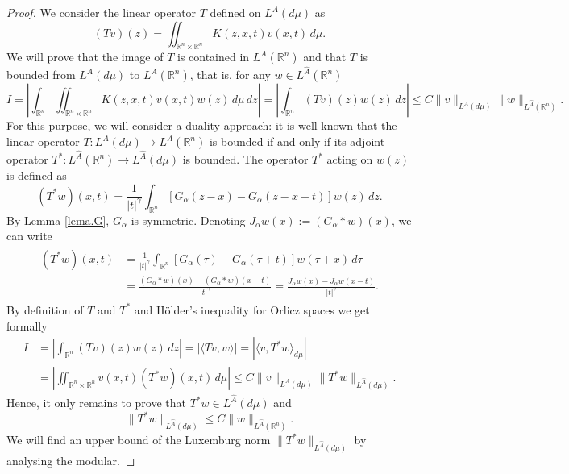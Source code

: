 \documentclass[leqno,twoside, 12pt]{amsart}
\theoremstyle{plain}
\numberwithin{equation}{section} \numberwithin{figure}{section}
\theoremstyle{definition}
\newcommand{\R}{\mathbb R}
\numberwithin{equation}{section}
\begin{document}
\begin{proof}
We consider the linear operator $T$ defined on $L^A(d\mu)$ as 
$$
(Tv)(z) = \iint_{\mathbb{R}^n \times \mathbb{R}^n} K(z,x,t) v(x,t) \,d\mu.
$$
We will prove that the image of $T$ is contained in $L^A(\R^n)$ and   that $T$ is bounded from $L^A(d\mu)$ to $L^A(\mathbb{R}^n)$, that is, for any $w \in L^{\hat{A}}(\mathbb{R}^n)$
$$
I=\left|\int_{\R^n} \iint_{\R^n \times \R^n} K(z,x,t) v(x,t) w(z)\,d\mu \,dz \right| = \left| \int_{\mathbb{R}^n} (Tv)(z) w(z) \, dz \right| \leq C \|v\|_{L^A(d\mu)} \|w\|_{L^{\hat{A}}(\mathbb{R}^n)}.
$$
For this purpose, we will consider a duality approach: it is well-known that the linear operator $T\colon L^A(d\mu)\to L^A(\R^n)$ is bounded if and only if its adjoint operator $T^*\colon L^{\hat A}(\R^n)\to L^{\hat A}(d\mu)$ is bounded. The operator $T^*$ acting on $w(z)$ is defined as
$$
(T^*w)(x,t) = \frac{1}{|t|^\gamma} \int_{\mathbb{R}^n} [G_\alpha(z-x) - G_\alpha(z-x+t)] w(z) \, dz.
$$
By Lemma \ref{lema.G}, $G_\alpha$ is symmetric. Denoting $J_\alpha w(x):= (G_\alpha*w)(x)$,  we  can write
\begin{align} \label{eqt.star}
\begin{split}
(T^*w)(x,t) &= \frac{1}{|t|^\gamma} \int_{\mathbb{R}^n} [G_\alpha(\tau) - G_\alpha(\tau+t)] w(\tau+x) \, d\tau\\ 
&= \frac{(G_\alpha* w)(x) - (G_\alpha*w)(x-t)}{|t|^\gamma}=\frac{J_\alpha w(x)- J_\alpha w(x-t)}{|t|^\gamma}.
\end{split}
\end{align}
By definition of $T$ and $T^*$ and H\"older's inequality for Orlicz spaces we get formally
\begin{align*}
I &= \left|\int_{\R^n} (Tv)(z) w(z)\,dz\right| = \left|\langle Tv,w\rangle\right| = \left|\langle v,T^* w\rangle_{d\mu}\right|\\ 
&= \left|\iint_{\R^n\times \R^n} v(x,t)(T^*w)(x,t)\,d\mu \right| \leq C \|v\|_{L^A(d\mu)} \|T^*w\|_{L^{\hat A}(d\mu)}.
\end{align*}
Hence, it only remains to prove that $T^* w \in L^{\hat A}(d\mu)$ and 
\begin{equation} \label{a.probar}
\|T^* w\|_{L^{\hat A}(d\mu)} \leq C \|w\|_{L^{\hat A}(\R^n)}.
\end{equation}
We will find an upper bound of the  Luxemburg norm $\|T^* w\|_{L^{\hat A}(d\mu)}$ by analysing the modular.


\end{proof}
\end{document}
